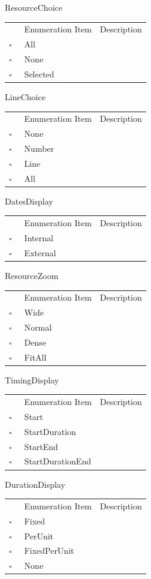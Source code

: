 ResourceChoice   
\begin{longtable}{llp{8cm}}
& Enumeration Item & Description \\
$\square$\ & All &  \\
$\square$\ & None &  \\
$\square$\ & Selected &  \\
\end{longtable}
LineChoice   
\begin{longtable}{llp{8cm}}
& Enumeration Item & Description \\
$\square$\ & None &  \\
$\square$\ & Number &  \\
$\square$\ & Line &  \\
$\square$\ & All &  \\
\end{longtable}
DatesDisplay   
\begin{longtable}{llp{8cm}}
& Enumeration Item & Description \\
$\square$\ & Internal &  \\
$\square$\ & External &  \\
\end{longtable}
ResourceZoom   
\begin{longtable}{llp{8cm}}
& Enumeration Item & Description \\
$\square$\ & Wide &  \\
$\square$\ & Normal &  \\
$\square$\ & Dense &  \\
$\square$\ & FitAll &  \\
\end{longtable}
TimingDisplay   
\begin{longtable}{llp{8cm}}
& Enumeration Item & Description \\
$\square$\ & Start &  \\
$\square$\ & StartDuration &  \\
$\square$\ & StartEnd &  \\
$\square$\ & StartDurationEnd &  \\
\end{longtable}
DurationDisplay   
\begin{longtable}{llp{8cm}}
& Enumeration Item & Description \\
$\square$\ & Fixed &  \\
$\square$\ & PerUnit &  \\
$\square$\ & FixedPerUnit &  \\
$\square$\ & None &  \\
\end{longtable}
